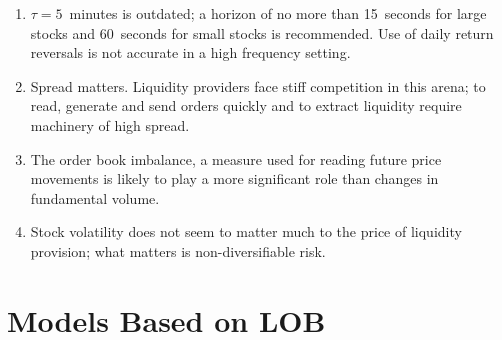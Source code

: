\begin{enumerate}[--]
\item $\tau=5$~minutes is outdated; a horizon of no more than 15~seconds for large stocks and 60~seconds for small stocks is recommended. Use of daily return reversals is not accurate in a high frequency setting.

\item Spread matters. Liquidity providers face stiff competition in this arena; to read, generate and send orders quickly and to extract liquidity require machinery of high spread. 

\item The order book imbalance, a measure used for reading future price movements is likely to play a more significant role than changes in fundamental volume. 

\item Stock volatility does not seem to matter much to the price of liquidity provision; what matters is non-diversifiable risk. 
\end{enumerate}



\section{Models Based on LOB\label{sec:model_based_lob}}

